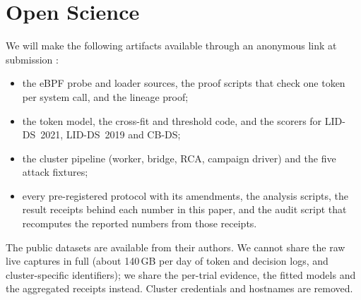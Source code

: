 \section*{Open Science}

We will make the following artifacts available through an anonymous link at submission :
\begin{itemize}
\item the eBPF probe and loader sources, the proof scripts that check one token per system call, and the lineage proof;
\item the token model, the cross-fit and threshold code, and the scorers for LID-DS~2021, LID-DS~2019 and CB-DS;
\item the cluster pipeline (worker, bridge, RCA, campaign driver) and the five attack fixtures;
\item every pre-registered protocol with its amendments, the analysis scripts, the result receipts behind each number
  in this paper, and the audit script that recomputes the reported numbers from those receipts.
\end{itemize}
The public datasets are available from their authors. We cannot share the raw live captures in full (about 140\,GB per
day of token and decision logs, and cluster-specific identifiers); we share the per-trial evidence, the fitted models
and the aggregated receipts instead. Cluster credentials and hostnames are removed.

